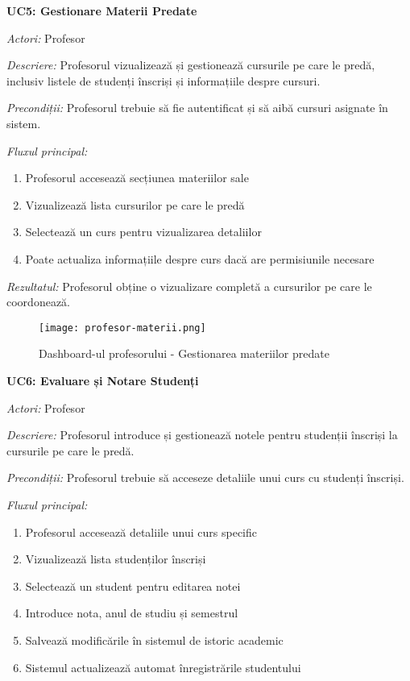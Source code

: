 \documentclass[12pt,a4paper]{report}
\begin{document}
\textbf{UC5: Gestionare Materii Predate}

\textit{Actori:} Profesor

\textit{Descriere:} Profesorul vizualizează și gestionează cursurile pe care le predă, inclusiv listele de studenți înscriși și informațiile despre cursuri.

\textit{Precondiții:} Profesorul trebuie să fie autentificat și să aibă cursuri asignate în sistem.

\textit{Fluxul principal:}
\begin{enumerate}
\item Profesorul accesează secțiunea materiilor sale
\item Vizualizează lista cursurilor pe care le predă
\item Selectează un curs pentru vizualizarea detaliilor
\item Poate actualiza informațiile despre curs dacă are permisiunile necesare
\end{enumerate}

\textit{Rezultatul:} Profesorul obține o vizualizare completă a cursurilor pe care le coordonează.

\begin{figure}[H]
\centering
\texttt{[image: profesor-materii.png]}
\caption{Dashboard-ul profesorului - Gestionarea materiilor predate}
\label{fig:profesor-materii}
\end{figure}

\textbf{UC6: Evaluare și Notare Studenți}

\textit{Actori:} Profesor

\textit{Descriere:} Profesorul introduce și gestionează notele pentru studenții înscriși la cursurile pe care le predă.

\textit{Precondiții:} Profesorul trebuie să acceseze detaliile unui curs cu studenți înscriși.

\textit{Fluxul principal:}
\begin{enumerate}
\item Profesorul accesează detaliile unui curs specific
\item Vizualizează lista studenților înscriși
\item Selectează un student pentru editarea notei
\item Introduce nota, anul de studiu și semestrul
\item Salvează modificările în sistemul de istoric academic
\item Sistemul actualizează automat înregistrările studentului
\end{enumerate}
\end{document}
